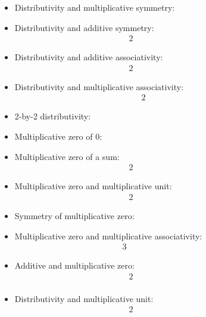 \documentclass[10pt]{simplearticle}
\newcommand{\tikzinput}[1]{}
\begin{document}
\begin{itemize}
\item Distributivity and multiplicative symmetry:
\begin{equation}
\tikzinput{d551}\label{eq:d551}
\end{equation}
\item Distributivity and additive symmetry:
\begin{alignat*}{2}
 & \tikzinput{d552} & \qquad\qquad & \tikzinput{d575}
\end{alignat*}
\item Distributivity and additive associativity:
\begin{alignat*}{2}
 & \tikzinput{d554} & \qquad\qquad & \tikzinput{d555}
\end{alignat*}
\item Distributivity and multiplicative associativity:
\begin{alignat}{2}
 & \tikzinput{d556} & \quad & \tikzinput{d557}\label{eq:d557}
\end{alignat}
\begin{equation}
\tikzinput{d558}\label{eq:d558}
\end{equation}
\item 2-by-2 distributivity:
\[
\tikzinput{d559}
\]
\item Multiplicative zero of 0:
\begin{equation}
\tikzinput{d560}\label{eq:d560}
\end{equation}
\item Multiplicative zero of a sum:
\begin{alignat*}{2}
 & \tikzinput{d561} & \qquad\qquad & \tikzinput{d562}
\end{alignat*}
\item Multiplicative zero and multiplicative unit:
\begin{alignat*}{2}
 & \tikzinput{d563} & \qquad\qquad & \tikzinput{d564}
\end{alignat*}
\item Symmetry of multiplicative zero:
\begin{equation}
\tikzinput{d565}\label{eq:d565}
\end{equation}
\item Multiplicative zero and multiplicative associativity:
\begin{alignat}{3}
 & \tikzinput{d566} & \qquad & \tikzinput{d567} & \qquad & \tikzinput{d568}\label{eq:d568}
\end{alignat}
\item Additive and multiplicative zero:
\begin{alignat*}{2}
 & \tikzinput{d569} & \qquad\qquad & \tikzinput{d570}\\
 & \tikzinput{d571} &\ 
& \tikzinput{d572}
\end{alignat*}
\item Distributivity and multiplicative unit:
\begin{alignat*}{2}
 & \tikzinput{d573} & \qquad\qquad & \tikzinput{d574}
\end{alignat*}
\end{itemize}
\end{document}
